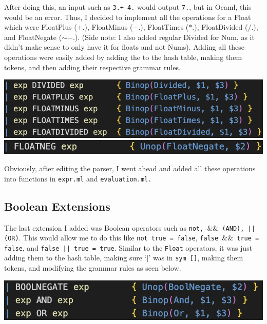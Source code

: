 \documentclass[12pt]{article}
\def\code#1{\texttt{#1}}
\begin{document}
After doing this, an input such as \code{3.+ 4.} would output \code{7.}, but in Ocaml, this would be an error. Thus, I decided to implement all the operations for a Float which were FloatPlus ($+.$), FloatMinus ($-.$), FloatTimes ($*.$), FloatDivided ($/.$), and FloatNegate ($\sim-.$). (Side note: I also added regular Divided for Num, as it didn't make sense to only have it for floats and not Nums). Adding all these operations were easily added by adding the to the hash table, making them tokens, and then adding their respective grammar rules.
\begin{center}
    \includegraphics{Float rules.png}
    \includegraphics{FloatNegate.png}
\end{center}

Obviously, after editing the parser, I went ahead and added all these operations into functions in  \code{expr.ml} and \code{evaluation.ml.}
\subsection{Boolean Extensions}
The last extension I added was Boolean operators such as \code{not, $\&\&$ (AND), || (OR)}. This would allow me to do this like \code{not true = false}, \code{false $\&\&$ true = false}, and \code{false || true = true}. Similar to the \code{Float} operators, it was just adding them to the hash table, making sure `$|$' was in \code{sym []}, making them tokens, and modifying the grammar rules as seen below.
\begin{center}
    \includegraphics{Bool.png}
\end{center}
\end{document}
